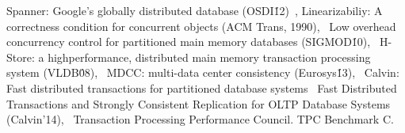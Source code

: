 


\iffalse
\parab{Bounded delay.}A network with bounded delay can improve reordering delay of \sys. Achieving bounded delay requires the queue length to be bounded and the network to be lossless. Recent years see progress in lossless data center networks~\cite{calder2013don,cheng2014catch,handley2017re} and fast detection of packet losses~\cite{li2016lossradar}.
Bounded queuing delay is also enabled by centralized controller~\cite{perry2015fastpass} or end-to-end flow control~\cite{gao2015phost,cho2017credit}.
\fi



\iffalse


Spanner: Google’s globally distributed database (OSDI\'12)~\cite{corbett2013spanner},
Linearizabiliy: A correctness condition for concurrent objects (ACM Trans, 1990),~\cite{herlihy1990linearizability}
Low overhead concurrency control for partitioned main memory databases (SIGMOD\'10),~\cite{jones2010low}
H-Store: a highperformance,
distributed main memory transaction processing
system (VLDB\'08),~\cite{kallman2008h}
MDCC: multi-data center consistency (Eurosys\'13),~\cite{kraska2013mdcc}
Calvin: Fast distributed transactions for
partitioned database systems~\cite{thomson2012calvin}
Fast Distributed Transactions and Strongly Consistent Replication
for OLTP Database Systems (Calvin'14),~\cite{thomson2014fast}
Transaction Processing Performance Council. TPC
Benchmark C.~\cite{council2005transaction}

